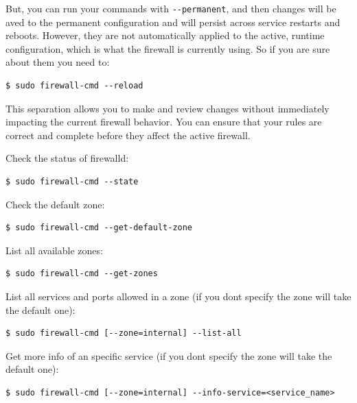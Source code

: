 \documentclass{article}
\newenvironment{blocktemplateI}[1]{%
    \tcolorbox[beamer,%
    noparskip,breakable,
    colframe=Violet,%
    colbacklower=Black,%
    title=#1]}%
    {\endtcolorbox}
\newenvironment{codetemplate}[1][]{%
  \mybasecolorbox[#1]
  \itshape
}{%
  \endmybasecolorbox
}
\begin{document}
But, you can run your commands with \verb|--permanent|, and then changes will be aved to the permanent configuration and will persist across service restarts and reboots. However, they are not automatically applied to the active, runtime configuration, which is what the firewall is currently using. So if you are sure about them you need to:
\begin{codetemplate}
\begin{verbatim}
$ sudo firewall-cmd --reload
\end{verbatim}
\end{codetemplate}

\begin{blocktemplateI}{Why Not Apply Automatically?}
This separation allows you to make and review changes without immediately impacting the current firewall behavior. You can ensure that your rules are correct and complete before they affect the active firewall.
\end{blocktemplateI}

Check the status of firewalld:
\begin{codetemplate}
\begin{verbatim}
$ sudo firewall-cmd --state
\end{verbatim}
\end{codetemplate}

Check the default zone:
\begin{codetemplate}
\begin{verbatim}
$ sudo firewall-cmd --get-default-zone
\end{verbatim}
\end{codetemplate}

List all available zones:
\begin{codetemplate}
\begin{verbatim}
$ sudo firewall-cmd --get-zones
\end{verbatim}
\end{codetemplate}

List all services and ports allowed in a zone (if you dont specify the zone will take the default one):
\begin{codetemplate}
\begin{verbatim}
$ sudo firewall-cmd [--zone=internal] --list-all
\end{verbatim}
\end{codetemplate}

Get more info of an specific service (if you dont specify the zone will take the default one):
\begin{codetemplate}
\begin{verbatim}
$ sudo firewall-cmd [--zone=internal] --info-service=<service_name>
\end{verbatim}
\end{codetemplate}
\end{document}
